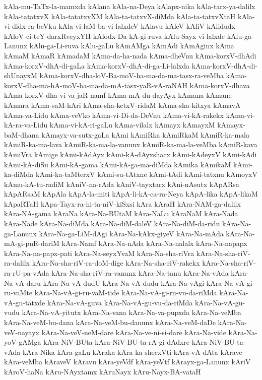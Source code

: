 {kAla-mu-TaTx-la-mamxda
kAlana
kAla-na-Deya
kAlapx-nika
kAla-tarx-ya-dalilx
kAla-tatatxvX
kAla-tatatxvXM
kAla-ta-tatxvX-diMda
kAla-ta-tatxvXtaH
kAla-vi-didx-ra-beVku
kAla-vi-laM-ba-vi-lalxdeV
kAlavu
kAleV
kAliV
kAlidudx
kAloV-ci-teY-darxRveyxYH
kAlodx-Da-kA-gi-ruva
kAlu-Sayx-vi-lalxde
kAlu-ga-Lanunx
kAlu-ga-Li-ruva
kAlu-gaLu
kAmAMga
kAmAdi
kAmAginx
kAma
kAmaM
kAmaR
kAmadaM
kAma-da-ha-nada
kAma-dheVnu
kAma-korxV-dhAdi
kAma-korxV-dhA-di-gaLa
kAma-korxV-dhA-di-ga-Li-lalxda
kAma-korxV-dhA-di-shUnayxM
kAma-korxV-dha-loV-Ba-moV-ha-ma-da-ma-tasx-ra-veMba
kAma-korxV-dha-ma-hA-moV-ha-ma-da-mA-tasx-yaR-vA-raNAH
kAma-korxV-dhava
kAma-korxV-dha-vi-va-jaR-namf
kAma-mA-du-dayAyx
kAmana
kAmane
kAmara
kAma-saM-hAri
kAma-sha-ketxV-ridaM
kAma-sha-kitxya
kAmavA
kAma-va-Lidu
kAma-veVko
kAma-vi-Di-da-DeVnu
kAma-vi-kA-rakekx
kAma-vi-kA-ra-va-Lidu
kAma-vi-kA-ri-gaLu
kAma-vilalx
kAmayx
kAmayxM
kAmayx-baM-dhana
kAmayx-va-sutx-gaLa
kAmi
kAmiRka
kAmiRkaM
kAmiR-ka-mala
kAmiR-ka-ma-lava
kAmiR-ka-ma-la-vanunx
kAmiR-ka-ma-la-veMba
kAmiR-kava
kAmiVra
kAmige
kAmi-kAdAyx
kAmi-kA-dAyxshacx
kAmi-kAdeyxV
kAmi-kAdi
kAmi-kA-diSu
kAmi-kA-gama
kAmi-kA-ga-ma-diMda
kAmika
kAmikaM
kAmi-ka-diMda
kAmi-ka-taMterxV
kAmi-su-tAtxne
kAmi-tAdi
kAmi-tatxnu
kAmoyxV
kAmu-kA-tu-radiM
kAniV-na-rAda
kAniV-tayxtarx
kAni-nAsutx
kApARsa
kApARsaM
kApAla
kApA-la-miti
kApA-li-kA-ca-ra-Neya
kApA-lika
kApA-likaM
kApaRTaH
kApa-Tayx-ra-hi-ta-niV-kiSxsi
kAra
kAraH
kAra-NAM-ga-dalilx
kAra-NA-gama
kAraNa
kAra-Na-BUtaM
kAra-NaLu
kAraNaM
kAra-Nada
kAra-Nade
kAra-Na-diMda
kAra-Na-diM-daleV
kAra-Na-diM-da-ridu
kAra-Na-ga-Lanunx
kAra-Na-ga-LiM-dAgi
kAra-Na-kAkx-giyeV
kAra-Na-mAda
kAra-Na-mA-gi-puR-dariM
kAra-Namf
kAra-Na-nAda
kAra-Na-nalalx
kAra-Na-napapx
kAra-Na-na-papx-pati
kAra-Na-seyxYvaM
kAra-Na-sha-riVra
kAra-Na-sha-riV-ra-dalilx
kAra-Na-sha-riV-ra-doM-dige
kAra-Na-sha-riV-rakekx
kAra-Na-sha-riV-ra-rU-pa-vAda
kAra-Na-sha-riV-ra-vanunx
kAra-Na-tanu
kAra-Na-vAda
kAra-Na-vA-daru
kAra-Na-vA-dudU
kAra-Na-vA-dudu
kAra-Na-vAgi
kAra-Na-vA-gi-ru-vaMte
kAra-Na-vA-gi-ru-vaM-tide
kAra-Na-vA-gi-ru-vu-da-riMda
kAra-Na-vA-gu-tatxde
kAra-Na-vA-guva
kAra-Na-vA-gu-vu-da-riMda
kAra-Na-vA-gu-vudu
kAra-Na-vA-yitutx
kAra-Na-vana
kAra-Na-va-pupxda
kAra-Na-veMba
kAra-Na-veM-bu-dana
kAra-Na-veM-bu-danunx
kAra-Na-veM-daDe
kAra-Na-veV-nayayx
kAra-Na-veV-neM-dare
kAra-Na-ve-ni-si-dare
kAra-Na-vide
kAra-Na-yoV-gAMga
kAra-NiV-BUta
kAra-NiV-BU-ta-rA-gi-dAdxre
kAra-NiV-BU-ta-vAda
kAra-Nika
kAra-gaLu
kAraka
kAra-ka-shecxVti
kAra-vA-dAta
kArave
kAra-veMba
kAraveV
kAravu
kAra-yeVdf
kAra-yeVtf
kArayx-ga-Lanunx
kAriV
kAroV-haNa
kAru-NAyxtamx
kAruNayx
kAru-Nayx-BA-vataH
}
